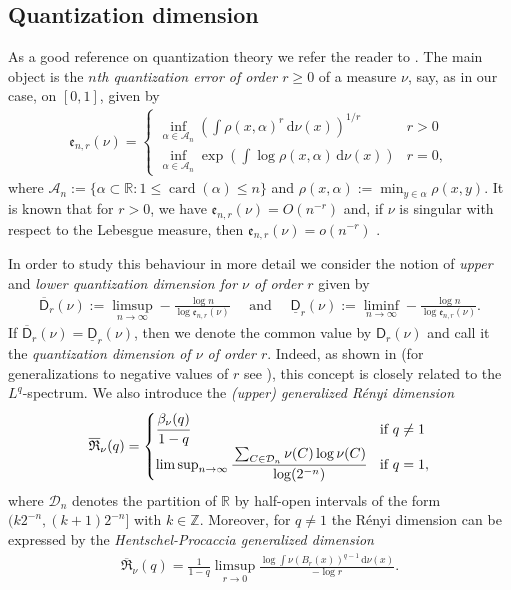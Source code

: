 \documentclass[11pt,reqno]{amsart}
\theoremstyle{plain}
\theoremstyle{definition}
\newcommand{\card}{\operatorname{card}}
\begin{document}
\subsection{Quantization dimension}
As a  good reference  on quantization theory we refer the reader to  \cite{GrafLuschgy}. The main object is the  {\em $n$th quantization error of order $r\geqslant 0$} of a measure $\nu$, say, as in our case, on $[0,1]$,  given by
\begin{align*}
 \mathfrak{e}_{n,r}(\nu)
 =\begin{cases}
   \inf_{\alpha\in\mathcal{A}_n}(\int \rho(x,\alpha)^r\,\mathrm{d}\nu(x))^{1/r}& r>0\\
   \inf_{\alpha\in\mathcal{A}_n}\exp(\int\log  \rho(x,\alpha)\,\mathrm{d}\nu(x))& r=0,
  \end{cases}
 \end{align*} 
where $\mathcal{A}_n:=\{\alpha \subset \mathbb{R}: 1\leqslant \card(\alpha)\leqslant n\}$
 and $\rho(x,\alpha):=\min_{y\in\alpha} \rho(x,y)$. 
 It is known that for $r>0$, we have $\mathfrak{e}_{n,r}(\nu)=O(n^{-r})$ and,  if $\nu$ is singular with respect to the Lebesgue measure, then $\mathfrak{e}_{n,r}(\nu)=o(n^{-r})$  \cite[p.~78]{GrafLuschgy}.

 
In order to study this behaviour in more detail  
 we consider the notion of  \emph{upper} and \emph{lower quantization dimension for $\nu$ of order $r$}  
 given by
 \begin{align*}
 \overline{\mathsf{D}}_r (\nu) := \limsup_{n\to\infty} -\frac{\log n}{\log \mathfrak{e}_{n,r}(\nu)}\quad \text{ and } \quad
 \underline{\mathsf{D}}_r (\nu) := \liminf_{n\to\infty} -\frac{\log n}{\log \mathfrak{e}_{n,r}(\nu)}.
\end{align*}
If $\overline{\mathsf{D}}_r (\nu) =\underline{\mathsf{D}}_r(\nu)$, then we denote the common value by $\mathsf{D}_r(\nu)$ and call it the \emph{quantization dimension of $\nu$ of order $r$}.
Indeed, as shown in \cite{KessNieZhu} (for  generalizations  to negative values of $r$ see  \cite{KessNieNegtive}), this concept is closely related to the $L^q$-spectrum. 
We also introduce the \emph{(upper) generalized R\'enyi dimension}  
\begin{align*}
 \overline{\mathfrak{R}}_{\nu}(q)
 =\begin{cases}\cfrac{\beta_{\nu}(q)}{1-q}&\text{if }q\neq 1\\
\limsup_{n\to \infty} \cfrac{\sum_{C\in \mathcal{D}_n} \nu(C) \log \nu(C)}{\log (2^{-n})}
&\text{if } q = 1,
  \end{cases}
\end{align*}
where $\mathcal{D}_n$ denotes the partition of $\mathbb{R}$ by half-open intervals of the form $(k 2^{-n}, (k+1) 2^{-n}]$ with $k\in\mathbb{Z}$. 
Moreover, for $q\neq 1$ the R\'enyi dimension can be expressed by the  
\emph{Hentschel-Procaccia generalized dimension}
\begin{align*}
 \overline{\mathfrak{R}}_{\nu}(q)
 =\frac{1}{1-q}\limsup_{r\to 0}\frac{\log \int\nu(B_r(x))^{q-1}\,\mathrm{d}\nu(x)}{-\log r}.
\end{align*}
\end{document}
